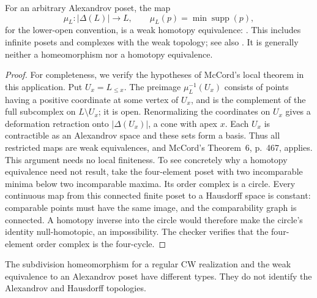 \begin{theorem}
\label{SA21-C12}
For an arbitrary Alexandrov poset, the map
\[
 \mu_L:|\Delta(L)|\longrightarrow L,
 \qquad \mu_L(p)=\min\operatorname{supp}(p),
\]
for the lower-open convention, is a weak homotopy equivalence:
\citet[Theorem~2, p.~466; construction in \S5, p.~469]{McCord1966}.
This includes infinite posets and complexes with the weak topology;
see also \citet[Theorem~1.4.6 and Remark~1.4.16]{Barmak2011}.
It is generally neither a homeomorphism nor a homotopy equivalence.
\end{theorem}
\begin{proof}

For completeness, we verify the hypotheses of McCord's local theorem
in this application. Put $U_x=L_{\le x}$. The preimage
$\mu_L^{-1}(U_x)$ consists of points having a positive coordinate at
some vertex of $U_x$, and is the complement of the full subcomplex
on $L\setminus U_x$; it is open. Renormalizing the coordinates on
$U_x$ gives a deformation retraction onto $|\Delta(U_x)|$, a cone
with apex $x$. Each $U_x$ is contractible as an Alexandrov space and
these sets form a basis. Thus all restricted maps are weak equivalences,
and McCord's Theorem~6, p.~467, applies. This argument needs no local
finiteness. To see concretely why a homotopy equivalence need not result,
take the four-element poset with two incomparable minima below two
incomparable maxima. Its order complex is a circle. Every continuous
map from this connected finite poset to a Hausdorff space is constant:
comparable points must have the same image, and the comparability graph
is connected. A homotopy inverse into the circle would therefore make
the circle's identity null-homotopic, an impossibility. The checker
verifies that the four-element order complex is the four-cycle.
\end{proof}

The subdivision homeomorphism for a regular CW realization and the
weak equivalence to an Alexandrov poset have different types. They do
not identify the Alexandrov and Hausdorff topologies.
